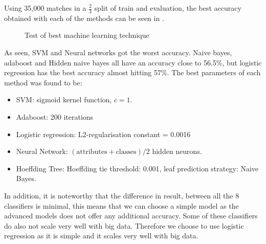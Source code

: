 Using 35,000 matches in a $\frac{2}{3}$ split of train and evaluation, the best accuracy obtained with each of the methods can be seen in . 

\begin{figure}[!htb]
\centering
  \caption{Test of best machine learning technique}\label{fig:besttech}
\end{figure}


As seen, SVM and Neural networks got the worst accuracy. Naive bayes, adaboost and Hidden naive bayes all have an accuracy close to 56.5\%, but logistic regression has the best accuracy almost hitting 57\%.
The best parameters of each method was found to be:
\begin{itemize}
\item SVM: sigmoid kernel function, $c = 1$.
\item Adaboost: 200 iterations
\item Logistic regression: L2-regularisation constant = 0.0016
\item Neural Network: $(\text{attributes} + \text{classes}) / 2$ hidden neurons.
\item Hoeffding Tree: Hoeffding tie threshold: 0.001, leaf prediction strategy: Naive Bayes.
\end{itemize}
In addition, it is noteworthy that the difference in result, between all the 8 classifiers is minimal, this means that we can choose a simple model as the advanced models does not offer any additional accuracy. Some of these classifiers do also not scale very well with big data. Therefore we choose to use logistic regression as it is simple and it scales very well with big data. 


